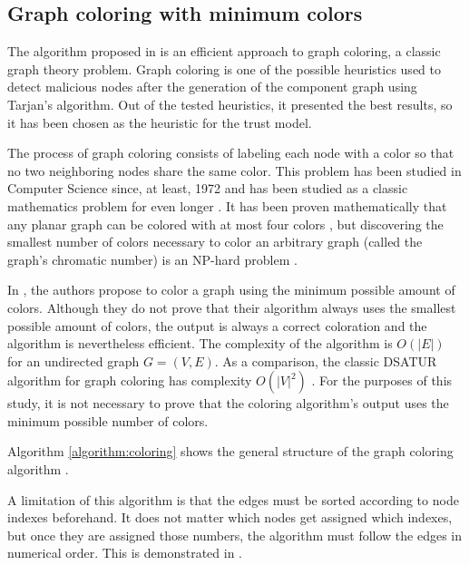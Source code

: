 \documentclass[conference]{IEEEtran}
\begin{document}
\subsection{Graph coloring with minimum colors}
\label{section:coloring}
The algorithm proposed in \cite{mittal2011graph} is an efficient approach to graph coloring, a classic graph theory problem.
Graph coloring is one of the possible heuristics used to detect malicious nodes after the generation of the component graph using Tarjan's algorithm.
Out of the tested heuristics, it presented the best results, so it has been chosen as the heuristic for the trust model.

The process of graph coloring consists of labeling each node with a color so that no two neighboring nodes share the same color.
This problem has been studied in Computer Science since, at least, 1972 \cite{karp1972reducibility} and has been studied as a classic mathematics problem for even longer \cite{kempe1879geographical}.
It has been proven mathematically that any planar graph can be colored with at most four colors \cite{appel1976every}, but discovering the smallest number of colors necessary to color an arbitrary graph (called the graph's chromatic number) is an NP-hard problem \cite{sanchez1989determining}.

In \cite{mittal2011graph}, the authors propose to color a graph using the minimum possible amount of colors.
Although they do not prove that their algorithm always uses the smallest possible amount of colors, the output is always a correct coloration and the algorithm is nevertheless efficient.
The complexity of the algorithm is $O(|E|)$ for an undirected graph $G = (V,E)$.
As a comparison, the classic DSATUR algorithm for graph coloring has complexity $O(|V|^2)$ \cite{brelaz1979new}.
For the purposes of this study, it is not necessary to prove that the coloring algorithm's output uses the minimum possible number of colors.

Algorithm \autoref{algorithm:coloring} shows the general structure of the graph coloring algorithm  \cite{mittal2011graph} \cite{vernize2013dissertation}.

A limitation of this algorithm is that the edges must be sorted according to node indexes beforehand.
It does not matter which nodes get assigned which indexes, but once they are assigned those numbers, the algorithm must follow the edges in numerical order.
This is demonstrated in \cite{vernize2013dissertation}.
\end{document}
